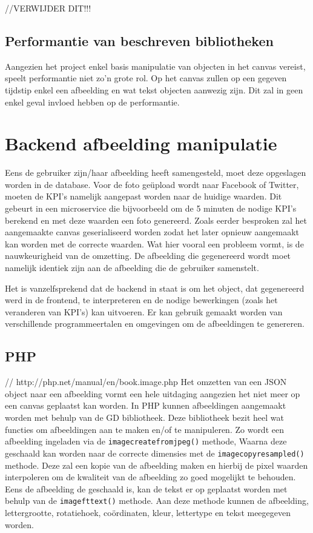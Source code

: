 //VERWIJDER DIT!!!
\subsection{Performantie van beschreven bibliotheken}
Aangezien het project enkel basis manipulatie van objecten in het canvas vereist, speelt performantie niet zo'n grote rol. Op het canvas zullen op een gegeven tijdstip enkel een afbeelding en wat tekst objecten aanwezig zijn. Dit zal in geen enkel geval invloed hebben op de performantie. 




\newpage
\section{Backend afbeelding manipulatie}
Eens de gebruiker zijn/haar afbeelding heeft samengesteld, moet deze opgeslagen worden in de database. Voor de foto ge\"{u}pload wordt naar Facebook of Twitter, moeten de KPI's namelijk aangepast worden naar de huidige waarden. Dit gebeurt in een microservice die bijvoorbeeld om de 5 minuten de nodige KPI's berekend en met deze waarden een foto genereerd. Zoals eerder besproken zal het aangemaakte canvas geserialiseerd worden zodat het later opnieuw aangemaakt kan worden met de correcte waarden. Wat hier vooral een probleem vormt, is de nauwkeurigheid van de omzetting. De afbeelding die gegenereerd wordt moet namelijk identiek zijn aan de afbeelding die de gebruiker samenstelt. 

Het is vanzelfsprekend dat de backend in staat is om het object, dat gegenereerd werd in de frontend, te interpreteren en de nodige bewerkingen (zoals het veranderen van KPI's) kan uitvoeren. Er kan gebruik gemaakt worden van verschillende programmeertalen en omgevingen om de afbeeldingen te genereren. 

\subsection{PHP} // http://php.net/manual/en/book.image.php
Het omzetten van een JSON object naar een afbeelding vormt een hele uitdaging aangezien het niet meer op een canvas geplaatst kan worden. In PHP kunnen afbeeldingen aangemaakt worden met behulp van de GD bibliotheek. Deze bibliotheek bezit heel wat functies om afbeeldingen aan te maken en/of te manipuleren. Zo wordt een afbeelding ingeladen via de \lstinline{imagecreatefromjpeg()} methode, Waarna deze geschaald kan worden naar de correcte dimensies met de \lstinline{imagecopyresampled()} methode. Deze zal een kopie van de afbeelding maken en hierbij de pixel waarden interpoleren om de kwaliteit van de afbeelding zo goed mogelijkt te behouden. Eens de afbeelding de geschaald is, kan de tekst er op geplaatst worden met behulp van de \lstinline{imagefttext()} methode. Aan deze methode kunnen de afbeelding, lettergrootte, rotatiehoek, co\"{o}rdinaten, kleur, lettertype en tekst meegegeven worden. 

